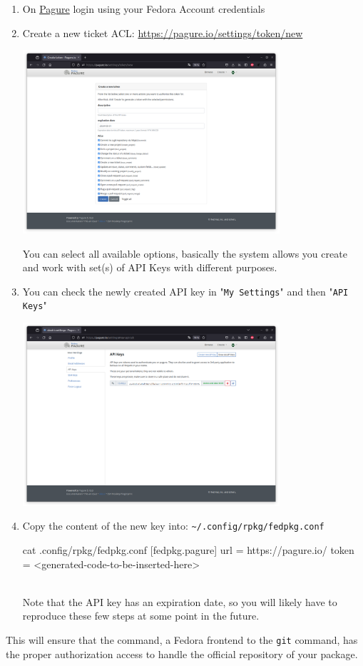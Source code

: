 \begin{enumerate}
\item On \href{https://pagure.io/}{Pagure} login using your Fedora Account credentials
\item Create a new ticket ACL: \href{https://pagure.io/settings/token/new}{https://pagure.io/settings/token/new}
\begin{center}
\includegraphics[width=0.75\textwidth,keepaspectratio=true,draft=\ddst]{img/rpms/pagure/pagure-1.eps}
\end{center}
You can select all available options, basically the system allows you create and work with set(s) of API Keys with different purposes. 
\item You can check the newly created API key in "\texttt{My Settings}" and then "\texttt{API Keys}"
\begin{center}
\includegraphics[width=0.75\textwidth,keepaspectratio=true,draft=\ddst]{img/rpms/pagure/pagure-3.eps}
\end{center}
\item Copy the content of the new key into: \texttt{\textasciitilde/.config/rpkg/fedpkg.conf}
\begin{scripti}
\fprompt{~} cat .config/rpkg/fedpkg.conf
[fedpkg.pagure]
url = https://pagure.io/
token = <generated-code-to-be-inserted-here>
\end{scripti}
\\[-0.75cm]
\noindent Note that the API key has an expiration date, so you will likely have to reproduce these few steps at some point in the future.
\end{enumerate}
This will ensure that the  command, a Fedora frontend to the \texttt{git} command, has the proper authorization access to handle the official repository of your package. 

